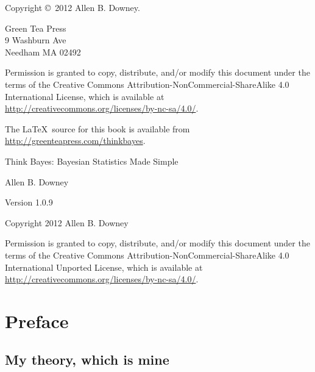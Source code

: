 \documentclass[12pt]{book}
\newcommand{\thetitle}{Think Bayes}
\newcommand{\thesubtitle}{Bayesian Statistics Made Simple}
\newcommand{\theversion}{1.0.9}
\begin{document}
\begin{latexonly}
Copyright \copyright ~2012 Allen B. Downey.


\vspace{0.2in}

\begin{flushleft}
Green Tea Press       \\
9 Washburn Ave \\
Needham MA 02492
\end{flushleft}

Permission is granted to copy, distribute, and/or modify this document
under the terms of the Creative Commons
Attribution-NonCommercial-ShareAlike 4.0 International License, which
is available at
\url{http://creativecommons.org/licenses/by-nc-sa/4.0/}.


The \LaTeX\ source for this book is available from
\url{http://greenteapress.com/thinkbayes}.

\vspace{0.2in}

\end{latexonly}



\begin{htmlonly}


{\Large \thetitle: \thesubtitle}

{\large Allen B. Downey}

Version \theversion

\vspace{0.25in}

Copyright 2012 Allen B. Downey

\vspace{0.25in}

Permission is granted to copy, distribute, and/or modify this document
under the terms of the Creative Commons 
Attribution-NonCommercial-ShareAlike 4.0 International
Unported License, which is available at
\url{http://creativecommons.org/licenses/by-nc-sa/4.0/}.

\setcounter{chapter}{-1}

\end{htmlonly}

\fi

\chapter{Preface}
\label{preface}

\section{My theory, which is mine}
\end{document}
